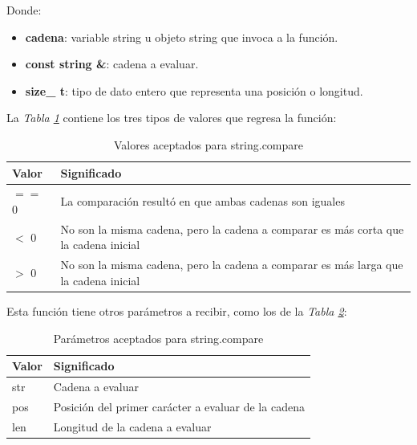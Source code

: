 Donde:
\begin{itemize}
	\item \textbf{cadena}: variable string u objeto string que invoca a la función.
	\item \textbf{const string \&}: cadena a evaluar.
	\item \textbf{size\_ t}: tipo de dato entero que representa una posición o longitud.
\end{itemize}

La \textit{Tabla \ref{tab: 3}} contiene los tres tipos de valores que regresa la función:
\begin{table}[H]
    \begin{center}
        \caption{Valores aceptados para string.compare}
        \label{tab: 3}
        \begin{tabular}{l l}
            \hline
            \textbf{Valor} & \textbf{Significado} \\
            \hline
            $==$ 0	& La comparación resultó en que ambas cadenas son iguales \\
            $<$ 0	& No son la misma cadena, pero la cadena a comparar es más corta que la cadena inicial \\
            $>$ 0	& No son la misma cadena, pero la cadena a comparar es más larga que la cadena inicial \\
            \hline
        \end{tabular}
    \end{center}
\end{table}

Esta función tiene otros parámetros a recibir, como los de la \textit{Tabla \ref{tab: 4}}:
\begin{table}[H]
    \begin{center}
        \caption{Parámetros aceptados para string.compare}
        \label{tab: 4}
        \begin{tabular}{l l}
            \hline
            \textbf{Valor} & \textbf{Significado} \\
            \hline
            str	& Cadena a evaluar \\
            pos	& Posición del primer carácter a evaluar de la cadena \\
            len	& Longitud de la cadena a evaluar \\
            \hline
        \end{tabular}
    \end{center}
\end{table}

